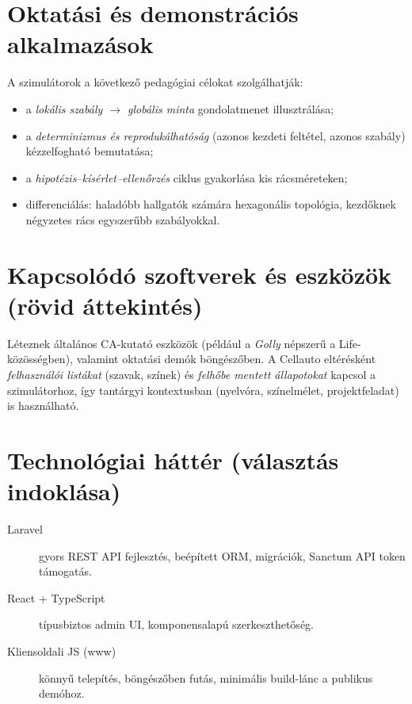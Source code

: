 \section{Oktatási és demonstrációs alkalmazások}
A szimulátorok a következő pedagógiai célokat szolgálhatják:
\begin{itemize}
  \item a \emph{lokális szabály $\rightarrow$ globális minta} gondolatmenet illusztrálása;
  \item a \emph{determinizmus és reprodukálhatóság} (azonos kezdeti feltétel, azonos szabály) kézzelfogható bemutatása;
  \item a \emph{hipotézis--kísérlet--ellenőrzés} ciklus gyakorlása kis rácsméreteken;
  \item differenciálás: haladóbb hallgatók számára hexagonális topológia, kezdőknek négyzetes rács egyszerűbb szabályokkal.
\end{itemize}

\section{Kapcsolódó szoftverek és eszközök (rövid áttekintés)}
Léteznek általános CA-kutató eszközök (például a \emph{Golly} népszerű a Life-közösségben), valamint oktatási demók böngészőben. A Cellauto eltérésként \emph{felhasználói listákat} (szavak, színek) és \emph{felhőbe mentett állapotokat} kapcsol a szimulátorhoz, így tantárgyi kontextusban (nyelvóra, színelmélet, projektfeladat) is használható.

\section{Technológiai háttér (választás indoklása)}
\begin{description}
  \item[Laravel] gyors REST API fejlesztés, beépített ORM, migrációk, Sanctum API token támogatás.
  \item[React + TypeScript] típusbiztos admin UI, komponensalapú szerkeszthetőség.
  \item[Kliensoldali JS (www)] könnyű telepítés, böngészőben futás, minimális build-lánc a publikus demóhoz.
\end{description}
